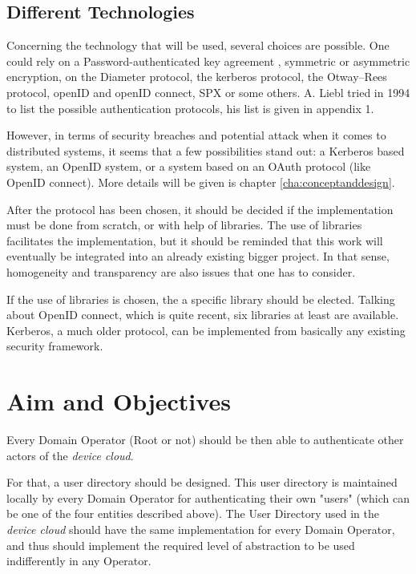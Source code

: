 \subsection{Different Technologies}
Concerning the technology that will be used, several choices are possible. One could rely on a Password-authenticated key agreement \cite{Hao2011}\cite{Pointcheval2012}\cite{Juang2008}, symmetric or asymmetric encryption\cite{Woo1997}\cite{Denning1982}, on the Diameter protocol, the kerberos protocol\cite{Sundareswaran}, the Otway–Rees protocol, openID\cite{Ghazizadeh} and openID connect, SPX\cite{Tardo1991} or some others. A. Liebl tried in 1994 to list the possible authentication protocols, his list is given in appendix 1.

However, in terms of security breaches and potential attack when it comes to distributed systems, it seems that a few possibilities stand out: a Kerberos based system, an OpenID system, or a system based on an OAuth protocol (like OpenID connect). More details will be given is chapter \ref{cha:conceptanddesign}.

After the protocol has been chosen, it should be decided if the implementation must be done from scratch, or with help of libraries. The use of libraries facilitates the implementation, but it should be reminded that this work will eventually be integrated into an already existing bigger project. In that sense, homogeneity and transparency are also issues that one has to consider. 

If the use of libraries is chosen, the a specific library should be elected. Talking about OpenID connect, which is quite recent, six libraries at least are available. Kerberos, a much older protocol, can be implemented from basically any existing security framework. 


\section{Aim and Objectives}
Every Domain Operator (Root or not) should be then able to authenticate other actors of the \emph{device cloud}.

For that, a user directory should be designed. This user directory is maintained locally by every Domain Operator for authenticating their own "users" (which can be one of the four entities described above). The User Directory used in the \emph{device cloud} should have the same implementation for every Domain Operator, and thus should implement the required level of abstraction to be used indifferently in any Operator.

